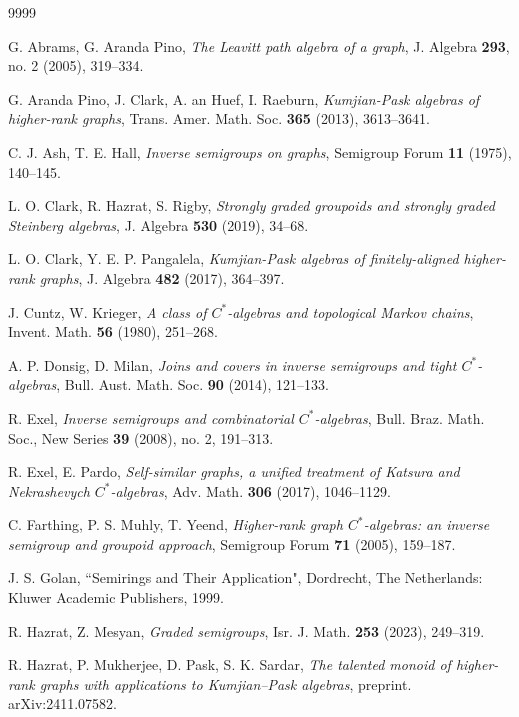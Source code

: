 \documentclass[a4paper,reqno,11pt]{amsart}
\numberwithin{equation}{section}
\theoremstyle{definition}
\theoremstyle{remark}
\begin{document}
\begin{thebibliography}{9999}

G. Abrams, G. Aranda Pino, \textit{The Leavitt path algebra of a graph}, J. Algebra \textbf{293}, no. 2 (2005), 319--334.

G. Aranda Pino, J. Clark, A. an Huef, I. Raeburn, \emph{Kumjian-Pask algebras of higher-rank graphs}, Trans. Amer. Math. Soc. \textbf{365} (2013), 3613--3641.
        
C. J. Ash, T. E. Hall, {\it Inverse semigroups on graphs}, Semigroup Forum {\bf 11} 
(1975), 140--145.

L. O. Clark, R. Hazrat, S. Rigby, \emph{Strongly graded groupoids and strongly graded Steinberg algebras}, J. Algebra \textbf{530} (2019), 34--68. 

L. O. Clark, Y. E. P. Pangalela, \emph{Kumjian-Pask algebras of finitely-aligned higher-rank graphs}, J. Algebra \textbf{482} (2017), 364--397.

J. Cuntz, W. Krieger, \emph{A class of $C^*$-algebras and topological Markov chains}, Invent. Math. \textbf{56} (1980), 251--268.

A. P. Donsig, D. Milan, \emph{Joins and covers in inverse semigroups and tight $C^*$-algebras}, Bull. Aust. Math. Soc. \textbf{90} (2014), 121--133.

R. Exel, \emph{Inverse semigroups and combinatorial $C^*$-algebras}, Bull. Braz. Math. Soc., New Series \textbf{39} (2008), no. 2, 191--313.

R. Exel, E. Pardo, \emph{Self-similar graphs, a unified treatment of Katsura and Nekrashevych $C^*$-algebras}, Adv. Math. \textbf{306} (2017), 1046--1129.

C. Farthing, P. S. Muhly, T. Yeend, \emph{Higher-rank graph $C^*$-algebras: an inverse semigroup and groupoid approach}, Semigroup Forum \textbf{71} (2005), 159--187.

J. S. Golan, ``Semirings and Their Application", Dordrecht, The Netherlands: Kluwer Academic Publishers, 1999.

R. Hazrat, Z. Mesyan, \emph{Graded semigroups}, Isr. J. Math. \textbf{253} (2023), 249--319.

R. Hazrat, P. Mukherjee, D. Pask, S. K. Sardar, \emph{The talented monoid of higher-rank graphs with applications to Kumjian--Pask algebras}, preprint. arXiv:2411.07582.


\end{thebibliography}
\end{document}
